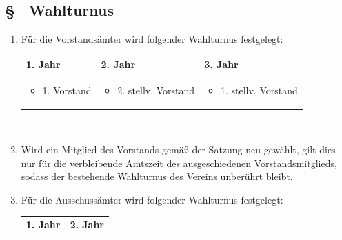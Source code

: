 \subsection{§ \thegoparagraphcounter\ Wahlturnus} \label{go:par:wahlturnus}
\begin{enumerate}
    \item \label{go:abs:e1ey4m} Für die Vorstandsämter wird folgender Wahlturnus festgelegt:

    \vspace{0.5cm}
    \noindent
    \begin{tabular}{p{5cm}p{5cm}p{5cm}}
    \textbf{1. Jahr} &
    \textbf{2. Jahr} &
    \textbf{3. Jahr} \\

    \begin{itemize}
        \item 1. Vorstand
    \end{itemize} &
    \begin{itemize}
        \item 2. stellv. Vorstand
    \end{itemize} &
    \begin{itemize}
        \item 1. stellv. Vorstand
    \end{itemize} \\
    \end{tabular} \\

    \vspace{0.5cm}

    \item \label{go:abs:nvhuj8} Wird ein Mitglied des Vorstands gemäß  der Satzung neu gewählt, gilt dies nur für die verbleibende Amtszeit des ausgeschiedenen Vorstandsmitglieds, sodass der bestehende Wahlturnus des Vereins unberührt bleibt. \\

    \item \label{go:abs:fhc5rj} Für die Ausschussämter wird folgender Wahlturnus festgelegt:

    \vspace{0.5cm}

    \begin{tabular}{p{5cm}p{5cm}}
    \textbf{1. Jahr} &
    \textbf{2. Jahr} \\


\end{tabular}
\end{enumerate}
